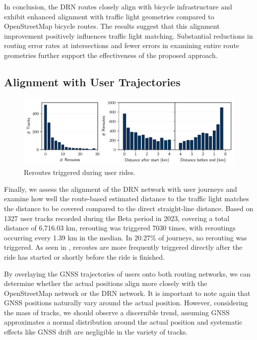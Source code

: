 In conclusion, the DRN routes closely align with bicycle infrastructure and exhibit enhanced alignment with traffic light geometries compared to OpenStreetMap bicycle routes. The results suggest that this alignment improvement positively influences traffic light matching. Substantial reductions in routing error rates at intersections and fewer errors in examining entire route geometries further support the effectiveness of the proposed approach.

\subsection{Alignment with User Trajectories}

\begin{figure}[t]
\centering 
\includegraphics[width=\linewidth]{images/routing-reroutes-distribution.pdf}
\caption{Reroutes triggered during user rides.}
\label{fig:routing-reroutes-distribution}
\end{figure}

Finally, we assess the alignment of the DRN network with user journeys and examine how well the route-based estimated distance to the traffic light matches the distance to be covered compared to the direct straight-line distance. Based on 1327 user tracks recorded during the Beta period in 2023, covering a total distance of 6,716.03 km, rerouting was triggered 7030 times, with reroutings occurring every 1.39 km in the median. In 20.27\% of journeys, no rerouting was triggered. As seen in , reroutes are more frequently triggered directly after the ride has started or shortly before the ride is finished.

By overlaying the GNSS trajectories of users onto both routing networks, we can determine whether the actual positions align more closely with the OpenStreetMap network or the DRN network. It is important to note again that GNSS positions naturally vary around the actual position. However, considering the mass of tracks, we should observe a discernible trend, assuming GNSS approximates a normal distribution around the actual position and systematic effects like GNSS drift are negligible in the variety of tracks.

